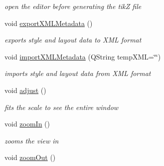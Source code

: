 \begin{DoxyCompactItemize}
\begin{DoxyCompactList}\small\item\em open the editor before generating the tik\+Z file \end{DoxyCompactList}\item 
\hypertarget{classMainWindow_a6508549190bb7d638e48317c65ed7380}{void \hyperlink{classMainWindow_a6508549190bb7d638e48317c65ed7380}{export\+X\+M\+L\+Metadata} ()}\label{classMainWindow_a6508549190bb7d638e48317c65ed7380}

\begin{DoxyCompactList}\small\item\em exports style and layout data to X\+M\+L format \end{DoxyCompactList}\item 
\hypertarget{classMainWindow_aacfffa2dff97903be79cd39468ed0388}{void \hyperlink{classMainWindow_aacfffa2dff97903be79cd39468ed0388}{import\+X\+M\+L\+Metadata} (Q\+String temp\+X\+M\+L=\char`\"{}\char`\"{})}\label{classMainWindow_aacfffa2dff97903be79cd39468ed0388}

\begin{DoxyCompactList}\small\item\em imports style and layout data from X\+M\+L format \end{DoxyCompactList}\item 
\hypertarget{classMainWindow_a38a21fe3722b03dff23981f5e7a7fb50}{void \hyperlink{classMainWindow_a38a21fe3722b03dff23981f5e7a7fb50}{adjust} ()}\label{classMainWindow_a38a21fe3722b03dff23981f5e7a7fb50}

\begin{DoxyCompactList}\small\item\em fits the scale to see the entire window \end{DoxyCompactList}\item 
\hypertarget{classMainWindow_aa13e39ece777521d3f176155899309a6}{void \hyperlink{classMainWindow_aa13e39ece777521d3f176155899309a6}{zoom\+In} ()}\label{classMainWindow_aa13e39ece777521d3f176155899309a6}

\begin{DoxyCompactList}\small\item\em zooms the view in \end{DoxyCompactList}\item 
\hypertarget{classMainWindow_a21d4700dd4bc51216443a4c788b85892}{void \hyperlink{classMainWindow_a21d4700dd4bc51216443a4c788b85892}{zoom\+Out} ()}\label{classMainWindow_a21d4700dd4bc51216443a4c788b85892}


\end{DoxyCompactItemize}
